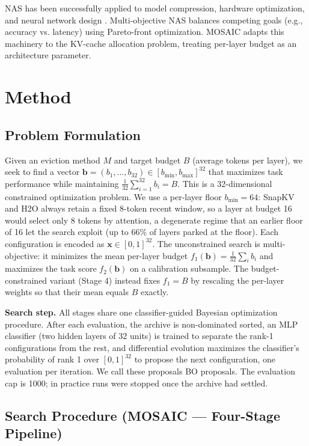 \documentclass[11pt]{article}
\begin{document}
NAS has been successfully applied to model compression, hardware optimization, and neural network design \citep{elsken2018neural}. Multi-objective NAS balances competing goals (e.g., accuracy vs. latency) using Pareto-front optimization. MOSAIC adapts this machinery to the KV-cache allocation problem, treating per-layer budget as an architecture parameter.

\section{Method}

\subsection{Problem Formulation}

Given an eviction method $M$ and target budget $B$ (average tokens per layer), we seek to find a vector $\mathbf{b} = (b_1, \ldots, b_{32}) \in [b_{\min}, b_{\max}]^{32}$ that maximizes task performance while maintaining $\frac{1}{32}\sum_{i=1}^{32} b_i = B$. This is a 32-dimensional constrained optimization problem. We use a per-layer floor $b_{\min} = 64$: SnapKV and H2O always retain a fixed 8-token recent window, so a layer at budget 16 would select only 8 tokens by attention, a degenerate regime that an earlier floor of 16 let the search exploit (up to 66\% of layers parked at the floor). Each configuration is encoded as $\mathbf{x} \in [0,1]^{32}$. The unconstrained search is multi-objective: it minimizes the mean per-layer budget $f_1(\mathbf{b}) = \frac{1}{32}\sum_i b_i$ and maximizes the task score $f_2(\mathbf{b})$ on a calibration subsample. The budget-constrained variant (Stage 4) instead fixes $f_1 = B$ by rescaling the per-layer weights so that their mean equals $B$ exactly.

\textbf{Search step.} All stages share one classifier-guided Bayesian optimization procedure. After each evaluation, the archive is non-dominated sorted, an MLP classifier (two hidden layers of 32 units) is trained to separate the rank-1 configurations from the rest, and differential evolution maximizes the classifier's probability of rank 1 over $[0,1]^{32}$ to propose the next configuration, one evaluation per iteration. We call these proposals BO proposals. The evaluation cap is 1000; in practice runs were stopped once the archive had settled.

\subsection{Search Procedure (MOSAIC — Four-Stage Pipeline)}
\end{document}
